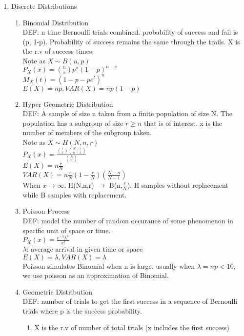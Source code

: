 \documentclass[10pt]{article}
\begin{document}
\begin{multicols}{2}
\begin{enumerate}
			\item Discrete Distributions
			\begin{enumerate}
				\item Binomial Distribution\\
				DEF: n time Bernoulli trials combined. probability of success and fail is (p, 1-p). Probability of success remains the same through the trails. X is the r.v of success times.\\
				Note as $X \sim B(n,p)$\\
				$P_X(x) = {n \choose x} p^x (1-p)^{n-x}$\\
				$M_X(t) = (1-p-pe^t)^n$\\
				$E(X) = np, VAR(X) = np(1-p)$
				\item Hyper Geometric Distribution\\
				DEF: A sample of size n taken from a finite population of size N. The population has a subgroup of size $r \ge n$ that is of interest. x is the number of members of the subgroup taken.\\
				Note as $X \sim H(N,n,r)$\\
				$P_X(x) = \frac{{r \choose x}{N-r \choose n-x}}{{N \choose n}}$\\
				$E(X) = n\frac{r}{N}$\\
				$VAR(X) = n\frac{r}{N}(1-\frac{r}{N})(\frac{N-n}{N-1})$\\
				When $x \rightarrow \infty$, H(N,n,r) $\rightarrow$ B(n,$\frac{r}{N}$). H samples without replacement while B samples with replacement.
				\item Poisson Process\\
				DEF: model the number of random occurance of some phenomenon in specific unit of space or time.\\
				$P_X(x) = \frac{e^{-\lambda}\lambda^x}{x!}$\\
				$\lambda$: average arrival in given time or space\\
				$E(X) = \lambda, VAR(X) = \lambda$\\
				Poisson simulates Binomial when n is large. usually when $\lambda = np < 10$, we use poisson as an approximation of Binomial.
				\item Geometric Distribution\\
				DEF: number of trials to get the first success in a sequence of Bernoulli trials where p is the success probability.
				\begin{enumerate}
					\item X is the r.v of number of total trials (x includes the first success)\\

\end{enumerate}
\end{enumerate}
\end{enumerate}
\end{multicols}
\end{document}
